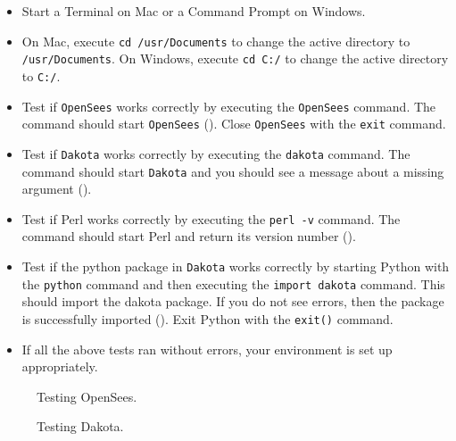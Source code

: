 \begin{itemize}
    \item Start a Terminal on Mac or a Command Prompt on Windows.
    \item On Mac, execute \texttt{cd /usr/Documents} to change the active directory to \texttt{/usr/Documents}. On Windows, execute \texttt{cd C:/} to change the active directory to \texttt{C:/}.
    \item Test if \texttt{OpenSees} works correctly by executing the \texttt{OpenSees} command. The command should start \texttt{OpenSees} (). Close \texttt{OpenSees} with the \texttt{exit} command.
    \item Test if \texttt{Dakota} works correctly by executing the \texttt{dakota} command. The command should start \texttt{Dakota} and you should see a message about a missing argument ().
    \item Test if Perl works correctly by executing the \texttt{perl -v} command. The command should start Perl and return its version number ().
    \item Test if the python package in \texttt{Dakota} works correctly by starting Python with the \texttt{python} command and then executing the \texttt{import dakota} command. This should import the dakota package. If you do not see errors, then the package is successfully imported (). Exit Python with the \texttt{exit()} command.
    \item If all the above tests ran without errors, your environment is set up appropriately.
\end{itemize}

\begin{figure}[!htbp]
  \caption{Testing OpenSees.}
  \label{fig:opensees_test}
\end{figure}

\begin{figure}[!htbp]
  \caption{Testing Dakota.}
  \label{fig:dakota_test}
\end{figure}

